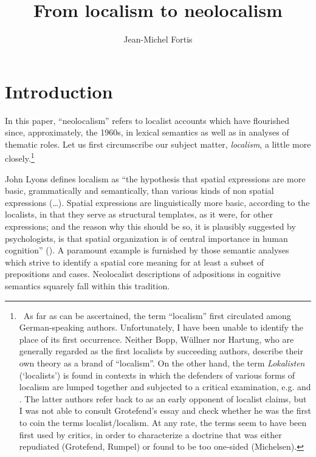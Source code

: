 \documentclass[english,output=paper,colorlinks,citecolor=brown]{../langscibook}
\author{Jean-Michel Fortis\affiliation{Research team Histoire des Théories Linguistiques, CNRS, Université de Paris}\orcid{}}
\title{From localism to neolocalism}
\begin{document}
\maketitle

\section{Introduction}
In this paper, “neolocalism” refers to localist accounts which have flourished since, approximately, the 1960s, in lexical semantics as well as in analyses of thematic roles. Let us first circumscribe our subject matter, \textit{localism}, a little more closely.\footnote{\textrm{~As far as can be ascertained, the term “localism” first circulated among German-speaking authors. Unfortunately, I have been unable to identify the place of its first occurrence. Neither Bopp, Wüllner nor Hartung, who are generally regarded as the first localists by succeeding authors, describe their own theory as a brand of “localism”. On the other hand, the term }\textrm{\textit{Lokalisten}}\textrm{ (‘localists’) is found in contexts in which the defenders of various forms of localism are lumped together and subjected to a critical examination, e.g. \citet{Michelsen1843} and \citet{Rumpel1845}. The latter authors refer back to \citet{Grotefend1835} as an early opponent of localist claims, but I was not able to consult Grotefend’s essay and check whether he was the first to coin the terms localist/localism. At any rate, the terms seem to have been first used by critics, in order to characterize a doctrine that was either repudiated (Grotefend, Rumpel) or found to be too one-sided (Michelsen).}} 
 
John Lyons defines localism as “the hypothesis that spatial expressions are more basic, grammatically and semantically, than various kinds of non spatial expressions (…). Spatial expressions are linguistically more basic, according to the localists, in that they serve as structural templates, as it were, for other expressions; and the reason why this should be so, it is plausibly suggested by psychologists, is that spatial organization is of central importance in human cognition” (\citealt[718]{Lyons1977}). A paramount example is furnished by those semantic analyses which strive to identify a spatial core meaning for at least a subset of prepositions and cases. Neolocalist descriptions of adpositions in cognitive semantics squarely fall within this tradition.
 
\end{document}
